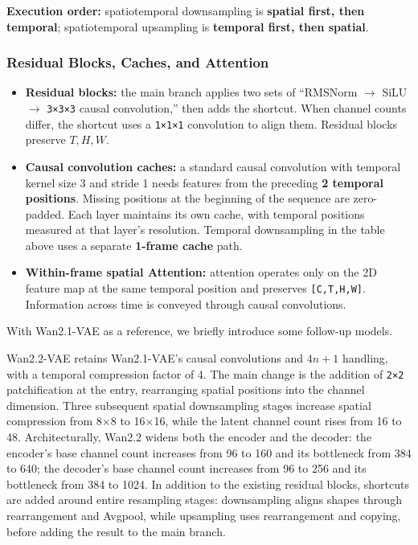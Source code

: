 \documentclass[
  11pt,
  a4paper,
]{article}
\providecommand{\tightlist}{%
  \setlength{\itemsep}{0pt}\setlength{\parskip}{0pt}}
\begin{document}
\endgroup

\textbf{Execution order:} spatiotemporal downsampling is \textbf{spatial
first, then temporal}; spatiotemporal upsampling is \textbf{temporal
first, then spatial}.


\subsubsection{Residual Blocks, Caches, and
Attention}\label{residual-blocks-caches-and-attention}

\begin{itemize}
\tightlist
\item
  \textbf{Residual blocks:} the main branch applies two sets of
  ``RMSNorm \(\rightarrow\) SiLU \(\rightarrow\) \texttt{3×3×3} causal
  convolution,'' then adds the shortcut. When channel counts differ, the
  shortcut uses a \texttt{1×1×1} convolution to align them. Residual
  blocks preserve \(T,H,W\).
\item
  \textbf{Causal convolution caches:} a standard causal convolution with
  temporal kernel size 3 and stride 1 needs features from the preceding
  \textbf{2 temporal positions}. Missing positions at the beginning of
  the sequence are zero-padded. Each layer maintains its own cache, with
  temporal positions measured at that layer's resolution. Temporal
  downsampling in the table above uses a separate \textbf{1-frame cache}
  path.
\item
  \textbf{Within-frame spatial Attention:} attention operates only on
  the 2D feature map at the same temporal position and preserves
  \texttt{{[}C,T,H,W{]}}. Information across time is conveyed through
  causal convolutions.
\end{itemize}

With Wan2.1-VAE as a reference, we briefly introduce some follow-up
models.

Wan2.2-VAE retains Wan2.1-VAE's causal convolutions and \(4n+1\)
handling, with a temporal compression factor of 4. The main change is
the addition of \texttt{2×2} patchification at the entry, rearranging
spatial positions into the channel dimension. Three subsequent spatial
downsampling stages increase spatial compression from 8×8 to 16×16,
while the latent channel count rises from 16 to 48. Architecturally,
Wan2.2 widens both the encoder and the decoder: the encoder's base
channel count increases from 96 to 160 and its bottleneck from 384 to
640; the decoder's base channel count increases from 96 to 256 and its
bottleneck from 384 to 1024. In addition to the existing residual
blocks, shortcuts are added around entire resampling stages:
downsampling aligns shapes through rearrangement and Avgpool, while
upsampling uses rearrangement and copying, before adding the result to
the main branch.
\end{document}
